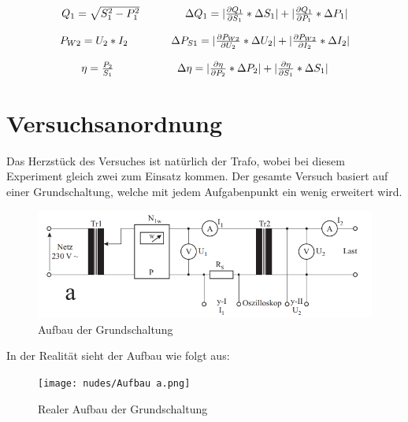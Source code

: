 \documentclass[12pt,a4paper,twoside]{article}
\begin{document}
\begin{equation}
    \label{eq:Blindleistung}
    \centerline{$Q_{1} = \sqrt{S_{1}^2 - P_{1}^2}$ \\ $\Delta Q_{1} = \vert \frac{\partial Q_{1}}{\partial S_{1}} * \Delta S_{1} \vert + \vert \frac{\partial Q_{1}}{\partial P_{1}} * \Delta P_{1} \vert $}
\end{equation}

\begin{equation}
    \label{eq:Wirkleistung}
    \centerline{$P_{W2} = U_{2}*I_{2}$ \\ $\Delta P_{S1} = \vert \frac{\partial P_{W2}}{\partial U_{2}} * \Delta U_{2} \vert + \vert \frac{\partial P_{W2}}{\partial I_{2}} * \Delta I_{2} \vert $}
\end{equation}

\begin{equation}
    \label{eq:Wirkungsgrad}
    \centerline{$\eta = \frac{P_{2}}{S_{1}}$ \\ $\Delta \eta = \vert \frac{\partial \eta}{\partial P_{2}} * \Delta P_{2} \vert + \vert \frac{\partial \eta}{\partial S_{1}} * \Delta S_{1} \vert $}
\end{equation}


\section{Versuchsanordnung} %

Das Herzstück des Versuches ist natürlich der Trafo, wobei bei diesem Experiment gleich zwei zum Einsatz kommen. Der gesamte Versuch basiert auf einer Grundschaltung, welche mit jedem Aufgabenpunkt ein wenig erweitert wird.

    \begin{figure}[H]
        \centering
        \includegraphics[width=0.6\linewidth, angle=0]{nudes/Versuchsaufbau a.png}
        \caption{Aufbau der Grundschaltung}
        \label{fig:AufbauDerGrundschaltung}
    \end{figure}

\noindent
In der Realität sieht der Aufbau wie folgt aus:

\begin{figure}[H]
    \centering
    \texttt{[image: nudes/Aufbau a.png]}
    \caption{Realer Aufbau der Grundschaltung}
    \label{fig:RealerAufbauDerGrundschaltung}
\end{figure}
\end{document}

